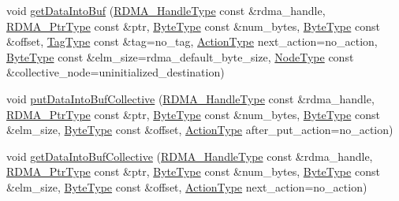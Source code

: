 \begin{DoxyCompactItemize}
\item 
void \hyperlink{structvt_1_1rdma_1_1_r_d_m_a_manager_aa97aeb2fee7d1a1b2228ff063d64eb5f}{get\+Data\+Into\+Buf} (\hyperlink{namespacevt_a10442579ec4e7ebef223818e64bcf908}{R\+D\+M\+A\+\_\+\+Handle\+Type} const \&rdma\+\_\+handle, \hyperlink{namespacevt_a9e2c953286c7616f7c218e9951790776}{R\+D\+M\+A\+\_\+\+Ptr\+Type} const \&ptr, \hyperlink{namespacevt_aab8d55968084610ce3b17057981e9300}{Byte\+Type} const \&num\+\_\+bytes, \hyperlink{namespacevt_aab8d55968084610ce3b17057981e9300}{Byte\+Type} const \&offset, \hyperlink{namespacevt_a84ab281dae04a52a4b243d6bf62d0e52}{Tag\+Type} const \&tag=no\+\_\+tag, \hyperlink{namespacevt_ae0a5a7b18cc99d7b732cb4d44f46b0f3}{Action\+Type} next\+\_\+action=no\+\_\+action, \hyperlink{namespacevt_aab8d55968084610ce3b17057981e9300}{Byte\+Type} const \&elm\+\_\+size=rdma\+\_\+default\+\_\+byte\+\_\+size, \hyperlink{namespacevt_a866da9d0efc19c0a1ce79e9e492f47e2}{Node\+Type} const \&collective\+\_\+node=uninitialized\+\_\+destination)
\item 
void \hyperlink{structvt_1_1rdma_1_1_r_d_m_a_manager_a9f5bbbbdc2d6cca20f3bd5a259ecaf62}{put\+Data\+Into\+Buf\+Collective} (\hyperlink{namespacevt_a10442579ec4e7ebef223818e64bcf908}{R\+D\+M\+A\+\_\+\+Handle\+Type} const \&rdma\+\_\+handle, \hyperlink{namespacevt_a9e2c953286c7616f7c218e9951790776}{R\+D\+M\+A\+\_\+\+Ptr\+Type} const \&ptr, \hyperlink{namespacevt_aab8d55968084610ce3b17057981e9300}{Byte\+Type} const \&num\+\_\+bytes, \hyperlink{namespacevt_aab8d55968084610ce3b17057981e9300}{Byte\+Type} const \&elm\+\_\+size, \hyperlink{namespacevt_aab8d55968084610ce3b17057981e9300}{Byte\+Type} const \&offset, \hyperlink{namespacevt_ae0a5a7b18cc99d7b732cb4d44f46b0f3}{Action\+Type} after\+\_\+put\+\_\+action=no\+\_\+action)
\item 
void \hyperlink{structvt_1_1rdma_1_1_r_d_m_a_manager_a68bf3378ec4132a81b728c180aa63686}{get\+Data\+Into\+Buf\+Collective} (\hyperlink{namespacevt_a10442579ec4e7ebef223818e64bcf908}{R\+D\+M\+A\+\_\+\+Handle\+Type} const \&rdma\+\_\+handle, \hyperlink{namespacevt_a9e2c953286c7616f7c218e9951790776}{R\+D\+M\+A\+\_\+\+Ptr\+Type} const \&ptr, \hyperlink{namespacevt_aab8d55968084610ce3b17057981e9300}{Byte\+Type} const \&num\+\_\+bytes, \hyperlink{namespacevt_aab8d55968084610ce3b17057981e9300}{Byte\+Type} const \&elm\+\_\+size, \hyperlink{namespacevt_aab8d55968084610ce3b17057981e9300}{Byte\+Type} const \&offset, \hyperlink{namespacevt_ae0a5a7b18cc99d7b732cb4d44f46b0f3}{Action\+Type} next\+\_\+action=no\+\_\+action)
\item 

\end{DoxyCompactItemize}
